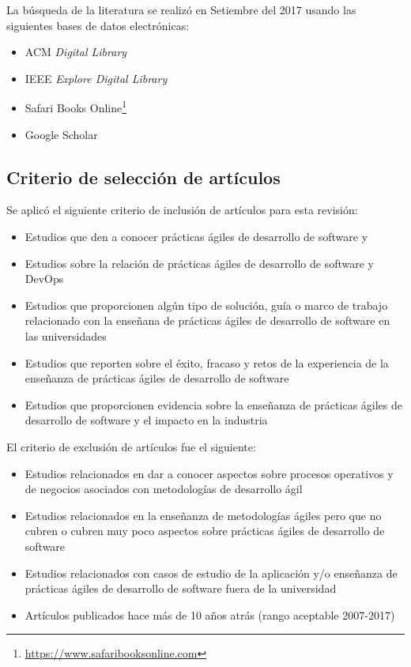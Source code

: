 \documentclass[journal]{IEEEtran}
\begin{document}
La búsqueda de la literatura se realizó en Setiembre del 2017 usando las siguientes bases de datos electrónicas:
\begin{itemize}
    \item ACM \emph{Digital Library} 
    \item IEEE \emph{Explore Digital Library}
    \item Safari Books Online\footnote{\url{https://www.safaribooksonline.com}}
    \item Google Scholar
\end{itemize}

\subsection{Criterio de selección de artículos}
Se aplicó el siguiente criterio de inclusión de artículos para esta revisión:
\begin{itemize}
    \item Estudios que den a conocer prácticas ágiles de desarrollo de software y 
    \item Estudios sobre la relación de prácticas ágiles de desarrollo de software y DevOps 
    \item Estudios que proporcionen algún tipo de solución, guía o marco de trabajo relacionado con la enseñana de prácticas ágiles de desarrollo de software en las universidades
    \item Estudios que reporten sobre el éxito, fracaso y retos de la experiencia de la enseñanza de prácticas ágiles de desarrollo de software
    \item Estudios que proporcionen evidencia sobre la enseñanza de prácticas ágiles de desarrollo de software y el impacto en la industria
\end{itemize}

El criterio de exclusión de artículos fue el siguiente:
\begin{itemize}
    \item Estudios relacionados en dar a conocer aspectos sobre procesos operativos y de negocios asociados con metodologías de desarrollo ágil
    \item Estudios relacionados en la enseñanza de metodologías ágiles pero que no cubren o cubren muy poco aspectos sobre prácticas ágiles de desarrollo de software
    \item Estudios relacionados con casos de estudio de la aplicación y/o enseñanza de prácticas ágiles de desarrollo de software fuera de la universidad
    \item Artículos publicados hace más de 10 años atrás (rango aceptable 2007-2017)
\end{itemize}
\end{document}
